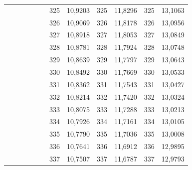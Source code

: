 \documentclass[a4paper,12pt]{article} %
\begin{document}
\begin{longtable}[c]{cccccccccc|c|c|}
	&  &  &  &  & \multicolumn{1}{c|}{} & \multicolumn{1}{c|}{325} & \multicolumn{1}{c|}{10,9203} & \multicolumn{1}{c|}{325} & 11,8296 & 325 & 13,1063 \\ \cline{7-12} 
	&  &  &  &  & \multicolumn{1}{c|}{} & \multicolumn{1}{c|}{326} & \multicolumn{1}{c|}{10,9069} & \multicolumn{1}{c|}{326} & 11,8178 & 326 & 13,0956 \\ \cline{7-12} 
	&  &  &  &  & \multicolumn{1}{c|}{} & \multicolumn{1}{c|}{327} & \multicolumn{1}{c|}{10,8918} & \multicolumn{1}{c|}{327} & 11,8053 & 327 & 13,0849 \\ \cline{7-12} 
	&  &  &  &  & \multicolumn{1}{c|}{} & \multicolumn{1}{c|}{328} & \multicolumn{1}{c|}{10,8781} & \multicolumn{1}{c|}{328} & 11,7924 & 328 & 13,0748 \\ \cline{7-12} 
	&  &  &  &  & \multicolumn{1}{c|}{} & \multicolumn{1}{c|}{329} & \multicolumn{1}{c|}{10,8639} & \multicolumn{1}{c|}{329} & 11,7797 & 329 & 13,0643 \\ \cline{7-12} 
	&  &  &  &  & \multicolumn{1}{c|}{} & \multicolumn{1}{c|}{330} & \multicolumn{1}{c|}{10,8492} & \multicolumn{1}{c|}{330} & 11,7669 & 330 & 13,0533 \\ \cline{7-12} 
	&  &  &  &  & \multicolumn{1}{c|}{} & \multicolumn{1}{c|}{331} & \multicolumn{1}{c|}{10,8362} & \multicolumn{1}{c|}{331} & 11,7543 & 331 & 13,0427 \\ \cline{7-12} 
	&  &  &  &  & \multicolumn{1}{c|}{} & \multicolumn{1}{c|}{332} & \multicolumn{1}{c|}{10,8214} & \multicolumn{1}{c|}{332} & 11,7420 & 332 & 13,0324 \\ \cline{7-12} 
	&  &  &  &  & \multicolumn{1}{c|}{} & \multicolumn{1}{c|}{333} & \multicolumn{1}{c|}{10,8075} & \multicolumn{1}{c|}{333} & 11,7288 & 333 & 13,0213 \\ \cline{7-12} 
	&  &  &  &  & \multicolumn{1}{c|}{} & \multicolumn{1}{c|}{334} & \multicolumn{1}{c|}{10,7926} & \multicolumn{1}{c|}{334} & 11,7161 & 334 & 13,0105 \\ \cline{7-12} 
	&  &  &  &  & \multicolumn{1}{c|}{} & \multicolumn{1}{c|}{335} & \multicolumn{1}{c|}{10,7790} & \multicolumn{1}{c|}{335} & 11,7036 & 335 & 13,0008 \\ \cline{7-12} 
	&  &  &  &  & \multicolumn{1}{c|}{} & \multicolumn{1}{c|}{336} & \multicolumn{1}{c|}{10,7641} & \multicolumn{1}{c|}{336} & 11,6912 & 336 & 12,9895 \\ \cline{7-12} 
	&  &  &  &  & \multicolumn{1}{c|}{} & \multicolumn{1}{c|}{337} & \multicolumn{1}{c|}{10,7507} & \multicolumn{1}{c|}{337} & 11,6787 & 337 & 12,9793 \\ \cline{7-12} 

\end{longtable}
\end{document}
